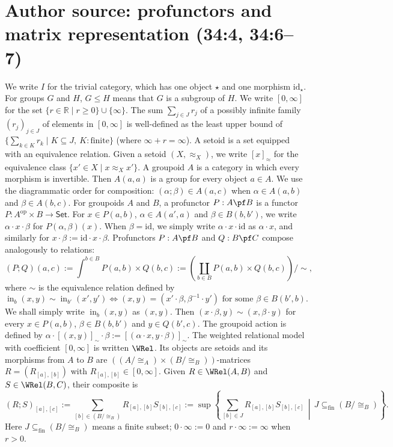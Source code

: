 \section*{Author source: profunctors and matrix representation (34:4, 34:6--7)}
We write $I$ for the trivial category, which has one object $\star$ and one morphism $\mathrm{id}_\star$. For groups $G$ and $H$, $G\le H$ means that $G$ is a subgroup of $H$.
We write $[0,\infty]$ for the set $\{r\in\mathbb R\mid r\ge0\}\cup\{\infty\}$. The sum $\sum_{j\in J}r_j$ of a possibly infinite family $(r_j)_{j\in J}$ of elements in $[0,\infty]$ is well-defined as the least upper bound of $\{\sum_{k\in K}r_k\mid K\subseteq J,\ K:\text{finite}\}$ (where $\infty+r=\infty$).
A setoid is a set equipped with an equivalence relation. Given a setoid $(X,\approx_X)$, we write $[x]_\approx$ for the equivalence class $\{x'\in X\mid x\approx_Xx'\}$.
A groupoid $A$ is a category in which every morphism is invertible. Then $A(a,a)$ is a group for every object $a\in A$. We use the diagrammatic order for composition: $(\alpha;\beta)\in A(a,c)$ when $\alpha\in A(a,b)$ and $\beta\in A(b,c)$.
For groupoids $A$ and $B$, a profunctor $P:A\pf B$ is a functor $P:A^{\mathrm{op}}\times B\to\mathsf{Set}$. For $x\in P(a,b)$, $\alpha\in A(a',a)$ and $\beta\in B(b,b')$, we write $\alpha\cdot x\cdot\beta$ for $P(\alpha,\beta)(x)$. When $\beta=\mathrm{id}$, we simply write $\alpha\cdot x\cdot\mathrm{id}$ as $\alpha\cdot x$, and similarly for $x\cdot\beta:=\mathrm{id}\cdot x\cdot\beta$.
Profunctors $P:A\pf B$ and $Q:B\pf C$ compose analogously to relations:
\[
(P;Q)(a,c):=\int^{b\in B}P(a,b)\times Q(b,c)
 :=\left(\coprod_{b\in B}P(a,b)\times Q(b,c)\right)/{\sim},
\]
where $\sim$ is the equivalence relation defined by
\[
\operatorname{in}_b(x,y)\sim\operatorname{in}_{b'}(x',y')
\Longleftrightarrow
(x,y)=(x'\cdot\beta,\beta^{-1}\cdot y')\text{ for some }\beta\in B(b',b).
\]
We shall simply write $\operatorname{in}_b(x,y)$ as $(x,y)$. Then $(x\cdot\beta,y)\sim(x,\beta\cdot y)$ for every $x\in P(a,b)$, $\beta\in B(b,b')$ and $y\in Q(b',c)$. The groupoid action is defined by $\alpha\cdot[(x,y)]_\sim\cdot\beta:=[(\alpha\cdot x,y\cdot\beta)]_\sim$.
The weighted relational model with coefficient $[0,\infty]$ is written $\WRel$. Its objects are setoids and its morphisms from $A$ to $B$ are $((A/{\cong_A})\times(B/{\cong_B}))$-matrices $R=(R_{[a],[b]})$ with $R_{[a],[b]}\in[0,\infty]$.
Given $R\in\WRel(A,B)$ and $S\in\WRel(B,C)$, their composite is
\[
(R;S)_{[a],[c]}:=\sum_{[b]\in(B/{\cong_B})}R_{[a],[b]}S_{[b],[c]}
:=\sup\left\{\sum_{[b]\in J}R_{[a],[b]}S_{[b],[c]}
 \,\middle|\,J\subseteq_{\mathrm{fin}}(B/{\cong_B})\right\}.
\]
Here $J\subseteq_{\mathrm{fin}}(B/{\cong_B})$ means a finite subset; $0\cdot\infty:=0$ and $r\cdot\infty:=\infty$ when $r>0$.
